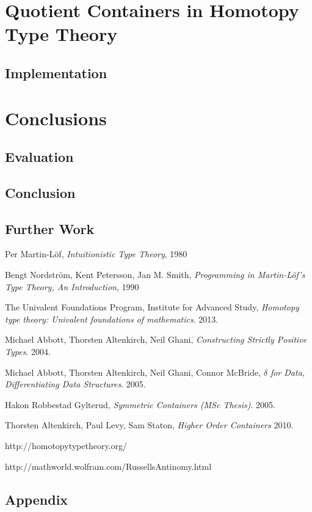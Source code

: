\documentclass[12pt]{report}
\begin{document}
\part{Quotient Containers in Homotopy Type Theory}

\chapter{Implementation}


\part{Conclusions}

\chapter{Evaluation}

\chapter{Conclusion}

\chapter{Further Work}

\cleardoublepage
{}
{}

\begin{thebibliography}{10}

  Per Martin-L\"of,
  \emph{Intuitionistic Type Theory},
  1980

  Bengt Nordstr\"om, Kent Petersson, Jan M. Smith,
  \emph{Programming in Martin-L\"of's Type Theory, An Introduction},
  1990

  The Univalent Foundations Program, Institute for Advanced Study,
  \emph{Homotopy type theory: Univalent foundations of mathematics}.
  2013.

  Michael Abbott, Thorsten Altenkirch, Neil Ghani,
  \emph{Constructing Strictly Positive Types}.
  2004.
  
  Michael Abbott, Thorsten Altenkirch, Neil Ghani, Connor McBride,
  \emph{$\delta$ for Data, Differentiating Data Structures}.
  2005.

  Hakon Robbestad Gylterud,
  \emph{Symmetric Containers (MSc Thesis)}.
  2005.
  
  Thorsten Altenkirch, Paul Levy, Sam Staton,
  \emph{Higher Order Containers}
  2010.
  
  http://homotopytypetheory.org/
  
  http://mathworld.wolfram.com/RussellsAntinomy.html

\end{thebibliography}
\cleardoublepage
{}
{}

\chapter{Appendix}
\end{document}
